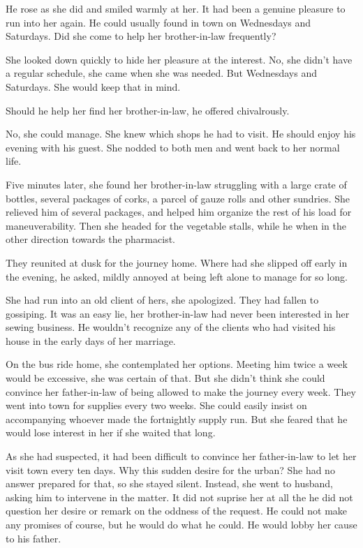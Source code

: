 \documentclass{article}
\begin{document}
He rose as she did and smiled warmly at her. It had been a genuine pleasure to run into her again. He could usually found in town on Wednesdays and Saturdays. Did she come to help her brother-in-law frequently?

She looked down quickly to hide her pleasure at the interest. No, she didn't have a regular schedule, she came when she was needed. But Wednesdays and Saturdays. She would keep that in mind.

Should he help her find her brother-in-law, he offered chivalrously.

No, she could manage. She knew which shops he had to visit. He should enjoy his evening with his guest. She nodded to both men and went back to her normal life.

Five minutes later, she found her brother-in-law struggling with a large crate of bottles, several packages of corks, a parcel of gauze rolls and other sundries. She relieved him of several packages, and helped him organize the rest of his load for maneuverability. Then she headed for the vegetable stalls, while he when in the other direction towards the pharmacist. 

They reunited at dusk for the journey home. Where had she slipped off early in the evening, he asked, mildly annoyed at being left alone to manage for so long. 

She had run into an old client of hers, she apologized. They had fallen to gossiping. It was an easy lie, her brother-in-law had never been interested in her sewing business. He wouldn't recognize any of the clients who had visited his house in the early days of her marriage. 

On the bus ride home, she contemplated her options. Meeting him twice a week would be excessive, she was certain of that. But she didn't think she could convince her father-in-law of being allowed to make the journey every week. They went into town for supplies every two weeks. She could easily insist on accompanying whoever made the fortnightly supply run. But she feared that he would lose interest in her if she waited that long. 

As she had suspected, it had been difficult to convince her father-in-law to let her visit town every ten days. Why this sudden desire for the urban? She had no answer prepared for that, so she stayed silent. Instead, she went to husband, asking him to intervene in the matter. It did not suprise her at all the he did not question her desire or remark on the oddness of the request. He could not make any promises of course, but he would do what he could. He would lobby her cause to his father. 
\end{document}
